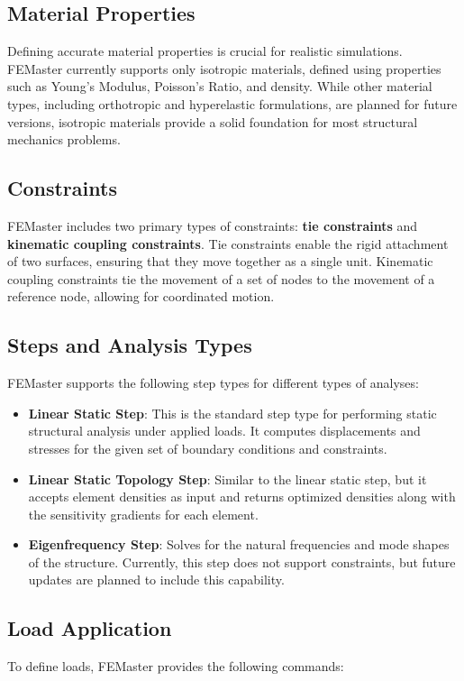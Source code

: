 \subsection{Material Properties}
\label{sec:material_properties}
Defining accurate material properties is crucial for realistic simulations. FEMaster currently supports only isotropic materials, defined using properties such as Young's Modulus, Poisson's Ratio, and density. While other material types, including orthotropic and hyperelastic formulations, are planned for future versions, isotropic materials provide a solid foundation for most structural mechanics problems.

\subsection{Constraints}
FEMaster includes two primary types of constraints: \textbf{tie constraints} and \textbf{kinematic coupling constraints}. Tie constraints enable the rigid attachment of two surfaces, ensuring that they move together as a single unit. Kinematic coupling constraints tie the movement of a set of nodes to the movement of a reference node, allowing for coordinated motion.

\subsection{Steps and Analysis Types}
FEMaster supports the following step types for different types of analyses:

\begin{itemize}
    \item \textbf{Linear Static Step}: This is the standard step type for performing static structural analysis under applied loads. It computes displacements and stresses for the given set of boundary conditions and constraints.
    \item \textbf{Linear Static Topology Step}: Similar to the linear static step, but it accepts element densities as input and returns optimized densities along with the sensitivity gradients for each element.
    \item \textbf{Eigenfrequency Step}: Solves for the natural frequencies and mode shapes of the structure. Currently, this step does not support constraints, but future updates are planned to include this capability.
\end{itemize}

\subsection{Load Application}
To define loads, FEMaster provides the following commands:


